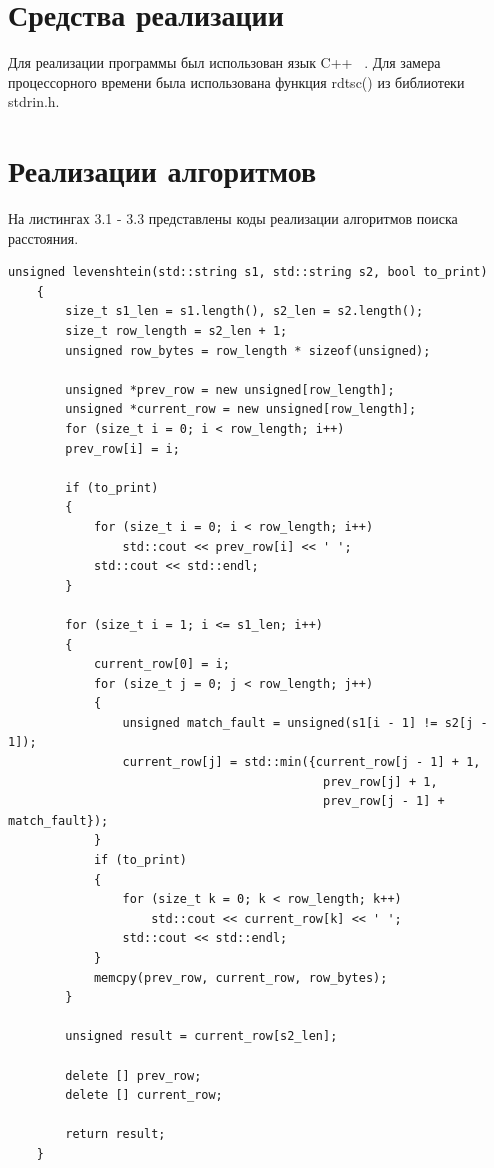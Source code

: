 \documentclass[12pt, a4paper]{report}
\begin{document}
	\section{Средства реализации}
	Для реализации программы был использован язык C++ ~\cite{CPP}. Для замера процессорного времени была использована функция rdtsc() из библиотеки stdrin.h.
	\section{Реализации алгоритмов}
	На листингах 3.1 - 3.3 представлены коды реализации алгоритмов поиска расстояния.
	\begin{lstlisting}[label=some-code,caption=Матричная реализация алгоритма Левенштейна]
	unsigned levenshtein(std::string s1, std::string s2, bool to_print)
	{
		size_t s1_len = s1.length(), s2_len = s2.length();
		size_t row_length = s2_len + 1;
		unsigned row_bytes = row_length * sizeof(unsigned);
		
		unsigned *prev_row = new unsigned[row_length];
		unsigned *current_row = new unsigned[row_length];
		for (size_t i = 0; i < row_length; i++)
		prev_row[i] = i;
		
		if (to_print)
		{
			for (size_t i = 0; i < row_length; i++)
				std::cout << prev_row[i] << ' ';
			std::cout << std::endl;
		}
		
		for (size_t i = 1; i <= s1_len; i++)
		{
			current_row[0] = i;
			for (size_t j = 0; j < row_length; j++)
			{
				unsigned match_fault = unsigned(s1[i - 1] != s2[j - 1]);
				current_row[j] = std::min({current_row[j - 1] + 1,
											prev_row[j] + 1,
											prev_row[j - 1] + match_fault});
			}
			if (to_print)
			{
				for (size_t k = 0; k < row_length; k++)
					std::cout << current_row[k] << ' ';
				std::cout << std::endl;
			}
			memcpy(prev_row, current_row, row_bytes);
		}
		
		unsigned result = current_row[s2_len];
		
		delete [] prev_row;
		delete [] current_row;
		
		return result;
	}
	\end{lstlisting}
\end{document}
